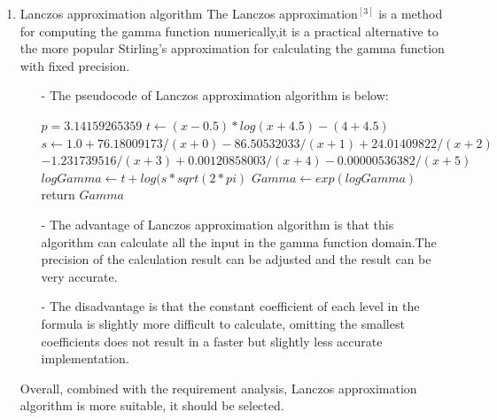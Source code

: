 \documentclass[12pt]{extarticle}
\newcommand{\<}{\langle}
\renewcommand{\>}{\rangle}
\theoremstyle{definition}
\begin{document}
\begin{enumerate}[\text{3.}1]
\begin{enumerate}
\end{enumerate}
\item Lanczos approximation algorithm
\newline
The Lanczos approximation$^{[3]}$ is a method for computing the gamma function numerically,it is a practical alternative to the more popular Stirling's approximation for calculating the gamma function with fixed precision.
\begin{enumerate}

\item[-]The pseudocode of Lanczos approximation algorithm is below: 

\begin{codebox}
\li $p=3.14159265359$
\li $t \gets (x-0.5)*log(x+4.5)-(4+4.5)$
\li $s \gets 1.0 + 76.18009173 / (x + 0) - 86.50532033 / (x + 1) + 24.01409822 / (x + 2)$ \\
$- 1.231739516 / (x + 3) + 0.00120858003 / (x + 4) - 0.00000536382 / (x + 5)$
\li $logGamma \gets t+log(s*sqrt(2*pi)$
\li $Gamma \gets exp(logGamma)$
\li return $Gamma$
\end{codebox}
\item[-]The advantage of Lanczos approximation algorithm is that this algorithm can calculate all the input in the gamma function domain.The precision of the calculation result can be adjusted and the result can be very accurate.
\item[-]The disadvantage is that the constant coefficient of each level in the formula is slightly more difficult to calculate, omitting the smallest coefficients does not result in a faster but slightly less accurate implementation.
\end{enumerate}
Overall, combined with the requirement analysis, Lanczos approximation algorithm is more suitable, it should be selected.
\end{enumerate}
\end{document}
